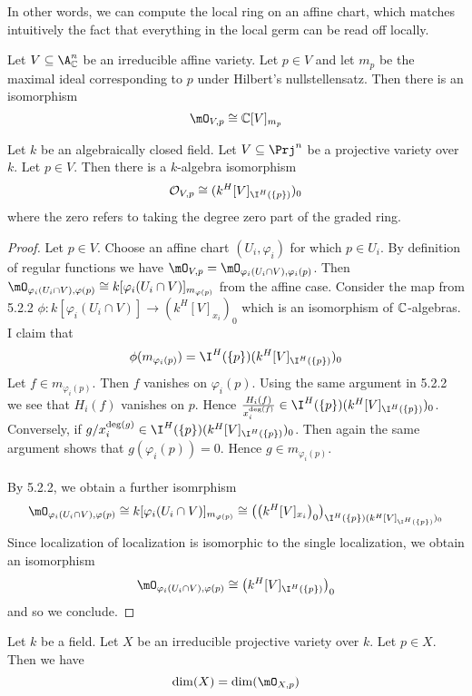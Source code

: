 \documentclass[a4paper]{article}
\begin{document}
In other words, we can compute the local ring on an affine chart, which matches intuitively the fact that everything in the local germ can be read off locally. 

\begin{prp}{}{} Let $V\subseteq\A_\C^n$ be an irreducible affine variety. Let $p\in V$ and let $m_p$ be the maximal ideal corresponding to $p$ under Hilbert's nullstellensatz. Then there is an isomorphism $$\mO_{V,p}\cong\C[V]_{m_p}$$
\end{prp}

\begin{prp}{}{} Let $k$ be an algebraically closed field. Let $V\subseteq\Prj^n$ be a projective variety over $k$. Let $p\in V$. Then there is a $k$-algebra isomorphism $$\mathcal{O}_{V,p}\cong(k^H[V]_{\I^H(\{p\})})_0$$ where the zero refers to taking the degree zero part of the graded ring. 
\begin{proof}
Let $p\in V$. Choose an affine chart $(U_i,\varphi_i)$ for which $p\in U_i$. By definition of regular functions we have $\mO_{V,p}=\mO_{\varphi_i(U_i\cap V),\varphi_i(p)}$.  Then $\mO_{\varphi_i(U_i\cap V),\varphi(p)}\cong k[\varphi_i(U_i\cap V)]_{m_{\varphi(p)}}$ from the affine case. Consider the map from 5.2.2 $\phi:k[\varphi_i(U_i\cap V)]\to (k^H[V]_{x_i})_0$ which is an isomorphism of $\mathbb{C}$-algebras. I claim that $$\phi(m_{\varphi_i(p)})=\I^H(\{p\})(k^H[V]_{\I^H(\{p\})})_0$$ Let $f\in m_{\varphi_i(p)}$. Then $f$ vanishes on $\varphi_i(p)$. Using the same argument in 5.2.2 we see that $H_i(f)$ vanishes on $p$. Hence $\frac{H_i(f)}{x_i^{\deg(f)}}\in\I^H(\{p\})(k^H[V]_{\I^H(\{p\})})_0$. Conversely, if $g/x_i^{\deg(g)}\in\I^H(\{p\})(k^H[V]_{\I^H(\{p\})})_0$. Then again the same argument shows that $g(\varphi_i(p))=0$. Hence $g\in m_{\varphi_i(p)}$. \\~\\

By 5.2.2, we obtain a further isomrphism $$\mO_{\varphi_i(U_i\cap V),\varphi(p)}\cong k[\varphi_i(U_i\cap V)]_{m_{\varphi(p)}}\cong\left(\left(k^H[V]_{x_i}\right)_0\right)_{\I^H(\{p\})(k^H[V]_{\I^H(\{p\})})_0}$$ Since localization of localization is isomorphic to the single localization, we obtain an isomorphism $$\mO_{\varphi_i(U_i\cap V),\varphi(p)}\cong\left(k^H[V]_{\I^H(\{p\})}\right)_0$$ and so we conclude. 
\end{proof}
\end{prp}

\begin{prp}{}{} Let $k$ be a field. Let $X$ be an irreducible projective variety over $k$. Let $p\in X$. Then we have $$\dim(X)=\dim(\mO_{X,p})$$
\end{prp}
\end{document}
